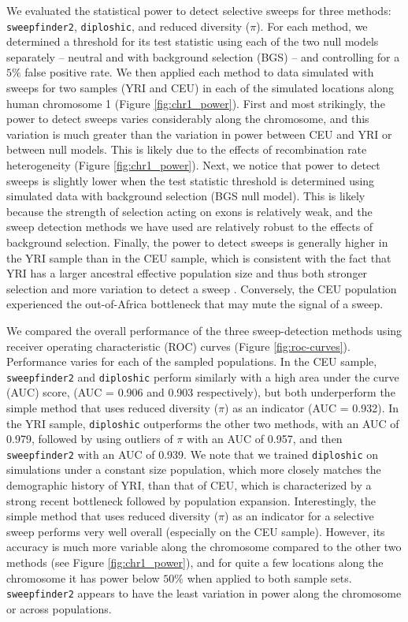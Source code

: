 \documentclass[hidelinks]{article}
\newcommand{\sweepfinder}{\texttt{sweepfinder2}\xspace}
\newcommand{\diploshic}{\texttt{diploshic}\xspace}
\begin{document}
    We evaluated the statistical power to detect selective sweeps for three methods:
    \sweepfinder \citep{degiorgio2016sweepfinder2},
    \diploshic \citep{kern2018diplos},
    and reduced diversity ($\pi$).
    For each method, we determined a threshold for its test statistic
    using each of the two null models separately -- neutral and with background selection (BGS)
    -- and controlling for a $5\%$ false positive rate.
    We then applied each method to data simulated with sweeps for two samples (YRI and CEU)
    in each of the simulated locations along human chromosome 1 (Figure \ref{fig:chr1_power}).
    First and most strikingly, the power to detect sweeps varies considerably along the chromosome,
    and this variation is much greater than the variation in power between CEU and YRI or between
    null models. This is likely due to the effects of recombination rate heterogeneity (Figure \ref{fig:chr1_power}).
    Next, we notice that power to detect sweeps is slightly lower when the test statistic threshold
    is determined using simulated data with background selection (BGS null model).
    This is likely because the strength of selection acting on exons is relatively weak, and the
    sweep detection methods we have used are relatively robust to the effects of background selection.
    Finally, the power to detect sweeps is generally higher in the YRI sample
    than in the CEU sample, which is consistent with the fact that YRI has a larger ancestral effective population size and
    thus both stronger selection and more variation to detect a sweep \citep[e.g.,][]{simonsen1995properties}.
    Conversely, the CEU population experienced the out-of-Africa bottleneck that may mute the signal of a sweep.

    We compared the overall performance of the three sweep-detection methods using
    receiver operating characteristic (ROC) curves (Figure \ref{fig:roc-curves}).
    Performance varies for each of the sampled populations.
    In the CEU sample, \sweepfinder and \diploshic perform similarly with a high area under the curve (AUC) score,
    (AUC = 0.906 and 0.903 respectively), but both underperform the simple method
    that uses reduced diversity ($\pi$) as an indicator (AUC = 0.932).
    In the YRI sample, \diploshic outperforms the other two methods,
    with an AUC of 0.979, followed by using outliers of $\pi$ with an AUC of 0.957,
    and then \sweepfinder with an AUC of 0.939.
    We note that we trained \diploshic on simulations under a constant size population,
    which more closely matches the demographic history of YRI, than that of CEU, which
    is characterized by a strong recent bottleneck followed by population expansion.
    Interestingly, the simple method that uses reduced diversity ($\pi$) as an indicator
    for a selective sweep performs very well overall (especially on the CEU sample).
    However, its accuracy is much more variable along the chromosome compared to the other two methods (see Figure \ref{fig:chr1_power}),
    and for quite a few locations along the chromosome it has power below $50\%$
    when applied to both sample sets.
    \sweepfinder appears to have the least variation in power along the chromosome or across populations.
\end{document}
